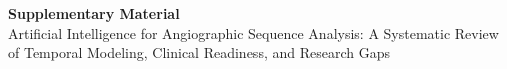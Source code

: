 \begin{center}
{\Large\bfseries Supplementary Material}\\[6pt]
{\large Artificial Intelligence for Angiographic Sequence Analysis: A Systematic Review of Temporal Modeling, Clinical Readiness, and Research Gaps}
\end{center}
\vspace{1em}
\setcounter{table}{0}
\renewcommand{\thetable}{S\arabic{table}}

\clearpage

\clearpage
\edit{}
